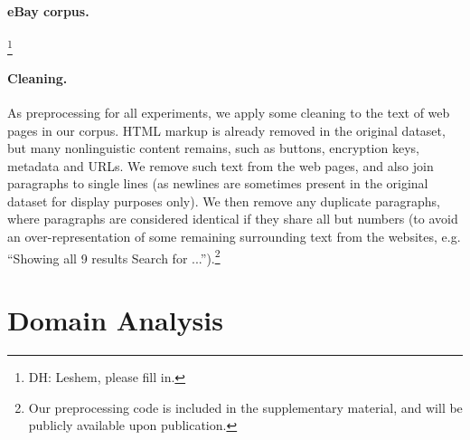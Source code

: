 \documentclass[11pt,a4paper,table]{article}
\newcommand{\daniel}[1]{\footnote{\color{brown}DH: #1}}
\begin{document}
\paragraph{eBay corpus.}\daniel{Leshem, please fill in.}

\paragraph{Cleaning.}

As preprocessing for all experiments, we apply some cleaning to the text
of web pages in our corpus.
HTML markup is already removed in the original dataset,
but many nonlinguistic content remains, such as
buttons, encryption keys, metadata and URLs.
We remove such text from the web pages, and also join paragraphs to single lines
(as newlines are sometimes present in the original dataset for display purposes
only).
We then remove any duplicate paragraphs, where paragraphs are considered
identical if they share all but numbers
(to avoid an over-representation of some remaining surrounding text from the
websites, e.g. ``Showing all 9 results Search for
...'').\footnote{Our preprocessing code is included in the supplementary
material, and will be publicly available upon publication.}

\section{Domain Analysis}
\end{document}
